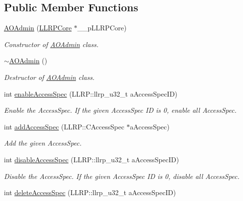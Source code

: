 \subsection*{Public Member Functions}
\begin{DoxyCompactItemize}
\item 
\hyperlink{class_e_l_f_i_n_1_1_a_o_admin_a2e1b2f780de7a4d3312eb0c4d5a9e9cc}{A\-O\-Admin} (\hyperlink{class_e_l_f_i_n_1_1_l_l_r_p_core}{L\-L\-R\-P\-Core} $\ast$\-\_\-\-\_\-p\-L\-L\-R\-P\-Core)
\begin{DoxyCompactList}\small\item\em Constructor of \hyperlink{class_e_l_f_i_n_1_1_a_o_admin}{A\-O\-Admin} class. \end{DoxyCompactList}\item 
\hyperlink{class_e_l_f_i_n_1_1_a_o_admin_a06a9286b19631ab519000d86ed81c29b}{$\sim$\-A\-O\-Admin} ()
\begin{DoxyCompactList}\small\item\em Destructor of \hyperlink{class_e_l_f_i_n_1_1_a_o_admin}{A\-O\-Admin} class. \end{DoxyCompactList}\item 
int \hyperlink{class_e_l_f_i_n_1_1_a_o_admin_a8f0296aef7586d378be8a390f4167e3d}{enable\-Access\-Spec} (L\-L\-R\-P\-::llrp\-\_\-u32\-\_\-t a\-Access\-Spec\-I\-D)
\begin{DoxyCompactList}\small\item\em Enable the Access\-Spec. If the given Access\-Spec I\-D is 0, enable all Access\-Spec. \end{DoxyCompactList}\item 
int \hyperlink{class_e_l_f_i_n_1_1_a_o_admin_ac493ec01485f6a3359958919ddace01a}{add\-Access\-Spec} (L\-L\-R\-P\-::\-C\-Access\-Spec $\ast$a\-Access\-Spec)
\begin{DoxyCompactList}\small\item\em Add the given Access\-Spec. \end{DoxyCompactList}\item 
int \hyperlink{class_e_l_f_i_n_1_1_a_o_admin_ad93a4f9cb1c041471b0cb451fb06c5c1}{disable\-Access\-Spec} (L\-L\-R\-P\-::llrp\-\_\-u32\-\_\-t a\-Access\-Spec\-I\-D)
\begin{DoxyCompactList}\small\item\em Disable the Access\-Spec. If the given Access\-Spec I\-D is 0, disable all Access\-Spec. \end{DoxyCompactList}\item 
int \hyperlink{class_e_l_f_i_n_1_1_a_o_admin_a1b8efe946d80673b80416c7103018967}{delete\-Access\-Spec} (L\-L\-R\-P\-::llrp\-\_\-u32\-\_\-t a\-Access\-Spec\-I\-D)

\end{DoxyCompactItemize}
